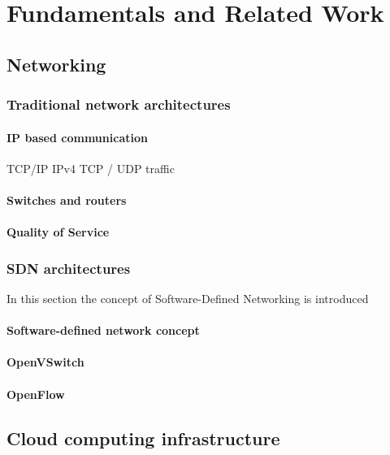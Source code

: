 \chapter{Fundamentals and Related Work}

\section{Networking}

\subsection{Traditional network architectures}

\subsubsection{IP based communication}
TCP/IP
IPv4
TCP / UDP traffic

\subsubsection{Switches and routers}

\subsubsection{Quality of Service}

\subsection{SDN architectures}

In this section the concept of Software-Defined Networking is introduced

\subsubsection{Software-defined network concept}

\subsubsection{OpenVSwitch}

\subsubsection{OpenFlow}

\section{Cloud computing infrastructure}

